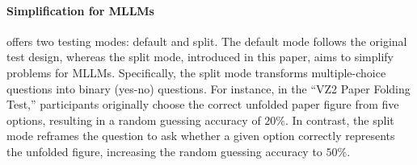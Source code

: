 \paragraph{Simplification for MLLMs}

{\methodname} offers two testing modes: default and split.
The default mode follows the original test design, whereas the split mode, introduced in this paper, aims to simplify problems for MLLMs.
Specifically, the split mode transforms multiple-choice questions into binary (yes-no) questions.
For instance, in the ``VZ2 Paper Folding Test,'' participants originally choose the correct unfolded paper figure from five options, resulting in a random guessing accuracy of $20\%$.
In contrast, the split mode reframes the question to ask whether a given option correctly represents the unfolded figure, increasing the random guessing accuracy to $50\%$.

